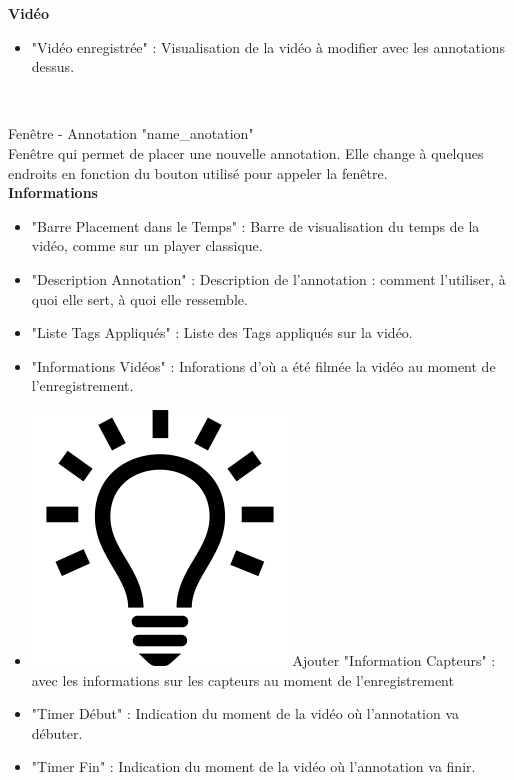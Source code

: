 \documentclass[11pt,french,a4paper]{report}
\begin{document}
\large \textbf{Vidéo}\normalsize
    \begin{itemize}[label=, leftmargin=*,parsep=0cm,itemsep=0cm,topsep=0cm]
        \item "Vidéo enregistrée" : Visualisation de la vidéo à modifier avec les annotations dessus.
    \end{itemize}

\dotfill \\
\clearpage

\Large Fenêtre - Annotation "name\_anotation"\normalsize \\
    Fenêtre qui permet de placer une nouvelle annotation. Elle change à quelques endroits en fonction
    du bouton utilisé pour appeler la fenêtre. \\
\large \textbf{Informations}\normalsize
    \begin{itemize}[label=, leftmargin=*,parsep=0cm,itemsep=0cm,topsep=0cm]
        \item "Barre Placement dans le Temps" : Barre de visualisation du temps de la vidéo, comme sur un player classique.
        \item "Description Annotation" : Description de l'annotation : comment l'utiliser, à quoi elle sert, à quoi elle ressemble.
        \item "Liste Tags Appliqués" : Liste des Tags appliqués sur la vidéo.
        \item "Informations Vidéos" : Inforations d'où a été filmée la vidéo au moment de l'enregistrement.
        \item \includegraphics[scale=0.05]{../images/logo/logo_ampoule} Ajouter "Information Capteurs" :
            avec les informations sur les capteurs au moment de l'enregistrement 
        \item "Timer Début" : Indication du moment de la vidéo où l'annotation va débuter.
        \item "Timer Fin" : Indication du moment de la vidéo où l'annotation va finir.
    \end{itemize}
\end{document}
